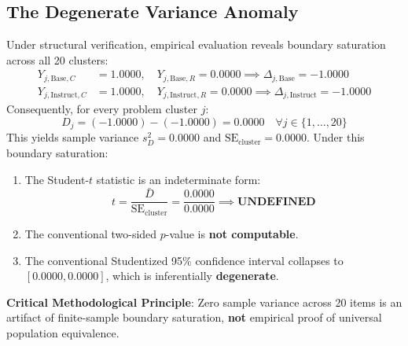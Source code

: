 \documentclass[11pt,letterpaper]{article}
\begin{document}
\subsection{The Degenerate Variance Anomaly}
Under structural verification, empirical evaluation reveals boundary saturation across all 20 clusters:
\begin{align}
Y_{j, \text{Base}, C} &= 1.0000, \quad Y_{j, \text{Base}, R} = 0.0000 \implies \Delta_{j, \text{Base}} = -1.0000 \\
Y_{j, \text{Instruct}, C} &= 1.0000, \quad Y_{j, \text{Instruct}, R} = 0.0000 \implies \Delta_{j, \text{Instruct}} = -1.0000
\end{align}
Consequently, for every problem cluster $j$:
\begin{equation}
D_j = (-1.0000) - (-1.0000) = 0.0000 \quad \forall j \in \{1, \dots, 20\}
\end{equation}
This yields sample variance $s_D^2 = 0.0000$ and $\mathrm{SE}_{\text{cluster}} = 0.0000$. Under this boundary saturation:
\begin{enumerate}
    \item The Student-$t$ statistic is an indeterminate form:
    \begin{equation}
    t = \frac{\bar{D}}{\mathrm{SE}_{\text{cluster}}} = \frac{0.0000}{0.0000} \implies \textbf{UNDEFINED}
    \end{equation}
    \item The conventional two-sided $p$-value is \textbf{not computable}.
    \item The conventional Studentized 95\% confidence interval collapses to $[0.0000, 0.0000]$, which is inferentially \textbf{degenerate}.
\end{enumerate}
\textbf{Critical Methodological Principle}: Zero sample variance across 20 items is an artifact of finite-sample boundary saturation, \textbf{not} empirical proof of universal population equivalence.
\end{document}
